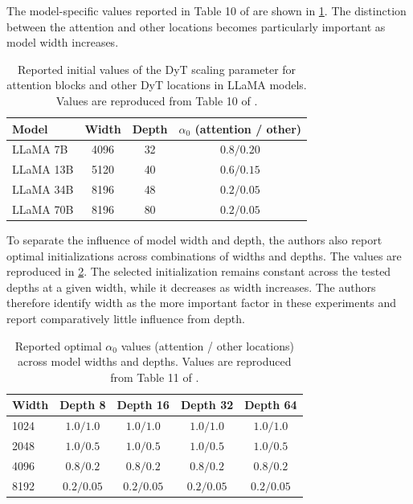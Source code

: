 The model-specific values reported in Table 10 of
\textcite{zhu2025dyt} are shown in
\cref{tab:norm-llama-alpha-init}. The distinction between the attention
and other locations becomes particularly important as model width
increases.

\begin{table}[htbp]
    \centering
    \caption{Reported initial values of the DyT scaling parameter for
    attention blocks and other DyT locations in LLaMA models. Values are
    reproduced from Table 10 of \textcite{zhu2025dyt}.}
    \label{tab:norm-llama-alpha-init}
    \begin{tabular}{lccc}
        \toprule
        Model & Width & Depth & \(\alpha_0\) (attention / other) \\
        \midrule
        LLaMA 7B  & 4096 & 32 & \(0.8/0.20\) \\
        LLaMA 13B & 5120 & 40 & \(0.6/0.15\) \\
        LLaMA 34B & 8196 & 48 & \(0.2/0.05\) \\
        LLaMA 70B & 8196 & 80 & \(0.2/0.05\) \\
        \bottomrule
    \end{tabular}
\end{table}

To separate the influence of model width and depth, the authors also
report optimal initializations across combinations of widths and depths.
The values are reproduced in
\cref{tab:norm-alpha-width-depth}. The selected initialization remains
constant across the tested depths at a given width, while it decreases
as width increases. The authors therefore identify width as the more
important factor in these experiments and report comparatively little
influence from depth.

\begin{table}[htbp]
    \centering
    \caption{Reported optimal \(\alpha_0\) values
    (attention / other locations) across model widths and depths.
    Values are reproduced from Table 11 of
    \textcite{zhu2025dyt}.}
    \label{tab:norm-alpha-width-depth}
    \begin{tabular}{lcccc}
        \toprule
        Width & Depth 8 & Depth 16 & Depth 32 & Depth 64 \\
        \midrule
        1024 & \(1.0/1.0\) & \(1.0/1.0\) & \(1.0/1.0\) & \(1.0/1.0\) \\
        2048 & \(1.0/0.5\) & \(1.0/0.5\) & \(1.0/0.5\) & \(1.0/0.5\) \\
        4096 & \(0.8/0.2\) & \(0.8/0.2\) & \(0.8/0.2\) & \(0.8/0.2\) \\
        8192 & \(0.2/0.05\) & \(0.2/0.05\) & \(0.2/0.05\) & \(0.2/0.05\) \\
        \bottomrule
    \end{tabular}
\end{table}

